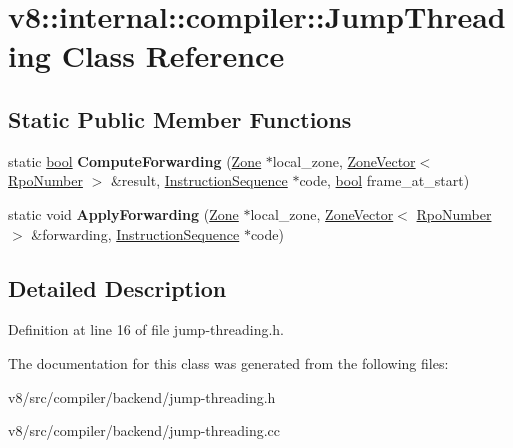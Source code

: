 \hypertarget{classv8_1_1internal_1_1compiler_1_1JumpThreading}{}\section{v8\+:\+:internal\+:\+:compiler\+:\+:Jump\+Threading Class Reference}
\label{classv8_1_1internal_1_1compiler_1_1JumpThreading}
\subsection*{Static Public Member Functions}
\begin{DoxyCompactItemize}
\item 
\mbox{\label{classv8_1_1internal_1_1compiler_1_1JumpThreading_a1a362fb15d7b05df5fe56545a308b117}} 
static \mbox{\hyperlink{classbool}{bool}} {\bfseries Compute\+Forwarding} (\mbox{\hyperlink{classv8_1_1internal_1_1Zone}{Zone}} $\ast$local\+\_\+zone, \mbox{\hyperlink{classv8_1_1internal_1_1ZoneVector}{Zone\+Vector}}$<$ \mbox{\hyperlink{classv8_1_1internal_1_1compiler_1_1RpoNumber}{Rpo\+Number}} $>$ \&result, \mbox{\hyperlink{classv8_1_1internal_1_1compiler_1_1InstructionSequence}{Instruction\+Sequence}} $\ast$code, \mbox{\hyperlink{classbool}{bool}} frame\+\_\+at\+\_\+start)
\item 
\mbox{\label{classv8_1_1internal_1_1compiler_1_1JumpThreading_ac6942348cf66b62b45cf1e9b4730effc}} 
static void {\bfseries Apply\+Forwarding} (\mbox{\hyperlink{classv8_1_1internal_1_1Zone}{Zone}} $\ast$local\+\_\+zone, \mbox{\hyperlink{classv8_1_1internal_1_1ZoneVector}{Zone\+Vector}}$<$ \mbox{\hyperlink{classv8_1_1internal_1_1compiler_1_1RpoNumber}{Rpo\+Number}} $>$ \&forwarding, \mbox{\hyperlink{classv8_1_1internal_1_1compiler_1_1InstructionSequence}{Instruction\+Sequence}} $\ast$code)
\end{DoxyCompactItemize}


\subsection{Detailed Description}


Definition at line 16 of file jump-\/threading.\+h.



The documentation for this class was generated from the following files\+:\begin{DoxyCompactItemize}
\item 
v8/src/compiler/backend/jump-\/threading.\+h\item 
v8/src/compiler/backend/jump-\/threading.\+cc\end{DoxyCompactItemize}
